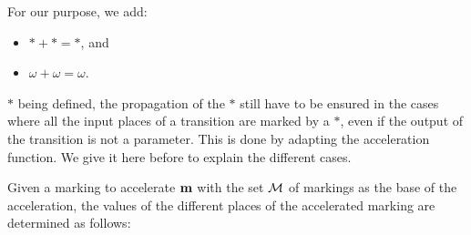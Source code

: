 For our purpose, we add: 
\begin{itemize}
  \item $* + * = *$, and
  \item $\omega + \omega = \omega$.
\end{itemize}

$*$ being defined, the propagation of the $*$ still have to be ensured in the cases where all the input places of a transition are marked by a $*$, even if the output of the transition is not a parameter.
This is done by adapting the acceleration function.
We give it here before to explain the different cases.

Given a marking to accelerate $\mathbf{m}$ with the set $\mathcal{M}$ of markings as the base of the acceleration,
the values of the different places of the accelerated marking are determined as follows:
